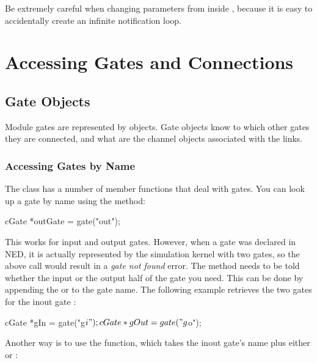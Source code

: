 \begin{note}
  Be extremely careful when changing parameters from inside
  , because it is easy to accidentally
  create an infinite notification loop.
\end{note}


\section{Accessing Gates and Connections}
\label{sec:simple-modules:gates}

\subsection{Gate Objects}
\label{sec:simple-modules:gate-objects}

Module gates are represented by  objects.
Gate objects know to which other gates they are connected, and
what are the channel objects associated with the links.

\subsubsection{Accessing Gates by Name}
\label{sec:simple-modules:accessing-gates-by-name}

The  class has a number of member functions that
deal with gates. You can look up a gate by name using the 
method:

\begin{cpp}
cGate *outGate = gate("out");
\end{cpp}

This works for input and output gates. However, when a gate was declared
 in NED, it is actually represented by the simulation kernel
with two gates, so the above call would result in a \textit{gate not found}
error. The  method needs to be told whether the input or
the output half of the gate you need. This can be done by appending
the  or  to the gate name. The following example
retrieves the two gates for the inout gate :

\begin{cpp}
cGate *gIn = gate("g$i");
cGate *gOut = gate("g$o");
\end{cpp}

Another way is to use the  function, which takes
the inout gate's name plus either  or :

